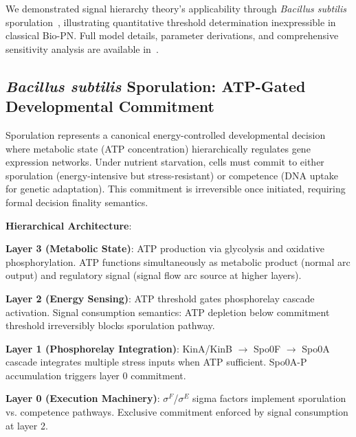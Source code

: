 
We demonstrated signal hierarchy theory's applicability through \textit{Bacillus subtilis} sporulation~\cite{subtilis2026}, illustrating quantitative threshold determination inexpressible in classical Bio-PN. Full model details, parameter derivations, and comprehensive sensitivity analysis are available in~\cite{subtilis2026}.

\subsection{\textit{Bacillus subtilis} Sporulation: ATP-Gated Developmental Commitment}

\vspace{3pt}
\noindent Sporulation represents a canonical energy-controlled developmental decision where metabolic state (ATP concentration) hierarchically regulates gene expression networks. Under nutrient starvation, cells must commit to either sporulation (energy-intensive but stress-resistant) or competence (DNA uptake for genetic adaptation). This commitment is irreversible once initiated, requiring formal decision finality semantics.

\vspace{3pt}
\noindent\textbf{Hierarchical Architecture}:

\vspace{3pt}
\noindent\textbf{Layer 3 (Metabolic State)}: ATP production via glycolysis and oxidative phosphorylation. ATP functions simultaneously as metabolic product (normal arc output) and regulatory signal (signal flow arc source at higher layers).

\vspace{3pt}
\noindent\textbf{Layer 2 (Energy Sensing)}: ATP threshold gates phosphorelay cascade activation. Signal consumption semantics: ATP depletion below commitment threshold irreversibly blocks sporulation pathway.

\vspace{3pt}
\noindent\textbf{Layer 1 (Phosphorelay Integration)}: KinA/KinB $\to$ Spo0F $\to$ Spo0A cascade integrates multiple stress inputs when ATP sufficient. Spo0A-P accumulation triggers layer 0 commitment.

\vspace{3pt}
\noindent\textbf{Layer 0 (Execution Machinery)}: $\sigma^F$/$\sigma^E$ sigma factors implement sporulation vs. competence pathways. Exclusive commitment enforced by signal consumption at layer 2.

